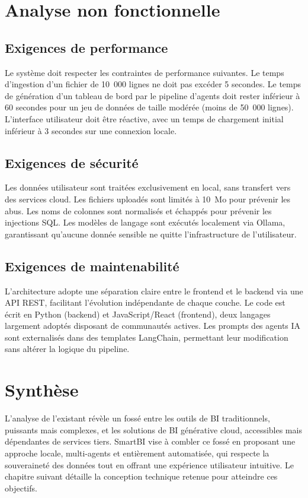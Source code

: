\section{Analyse non fonctionnelle}

\subsection{Exigences de performance}

Le système doit respecter les contraintes de performance suivantes. Le temps d'ingestion d'un fichier de 10~000 lignes ne doit pas excéder 5 secondes. Le temps de génération d'un tableau de bord par le pipeline d'agents doit rester inférieur à 60 secondes pour un jeu de données de taille modérée (moins de 50~000 lignes). L'interface utilisateur doit être réactive, avec un temps de chargement initial inférieur à 3 secondes sur une connexion locale.

\subsection{Exigences de sécurité}

Les données utilisateur sont traitées exclusivement en local, sans transfert vers des services cloud. Les fichiers uploadés sont limités à 10~Mo pour prévenir les abus. Les noms de colonnes sont normalisés et échappés pour prévenir les injections SQL. Les modèles de langage sont exécutés localement via Ollama, garantissant qu'aucune donnée sensible ne quitte l'infrastructure de l'utilisateur.

\subsection{Exigences de maintenabilité}

L'architecture adopte une séparation claire entre le frontend et le backend via une API REST, facilitant l'évolution indépendante de chaque couche. Le code est écrit en Python (backend) et JavaScript/React (frontend), deux langages largement adoptés disposant de communautés actives. Les prompts des agents IA sont externalisés dans des templates LangChain, permettant leur modification sans altérer la logique du pipeline.

\section{Synthèse}

L'analyse de l'existant révèle un fossé entre les outils de BI traditionnels, puissants mais complexes, et les solutions de BI générative cloud, accessibles mais dépendantes de services tiers. SmartBI vise à combler ce fossé en proposant une approche locale, multi-agents et entièrement automatisée, qui respecte la souveraineté des données tout en offrant une expérience utilisateur intuitive. Le chapitre suivant détaille la conception technique retenue pour atteindre ces objectifs.
